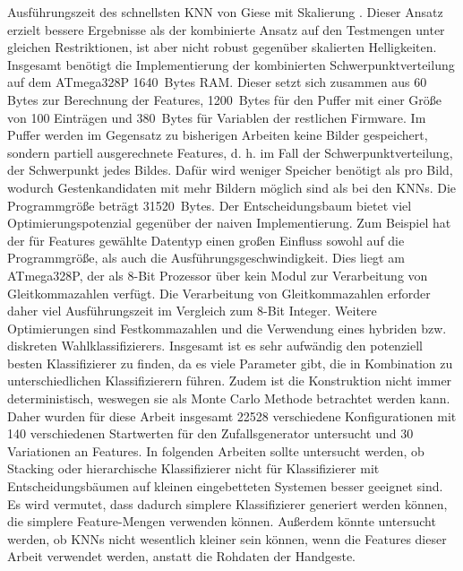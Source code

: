 Ausführungszeit des schnellsten KNN von Giese mit Skalierung \cite{gieseThesis}. Dieser Ansatz erzielt bessere Ergebnisse als der kombinierte Ansatz auf den Testmengen unter gleichen Restriktionen,
ist aber nicht robust gegenüber skalierten Helligkeiten.
\newline
\newline
Insgesamt benötigt die Implementierung der kombinierten Schwerpunktverteilung auf dem ATmega328P 1640~Bytes RAM. Dieser setzt sich zusammen aus 60 Bytes zur Berechnung der Features, 1200~Bytes
für den Puffer mit einer Größe von 100 Einträgen und 380~Bytes für Variablen der restlichen Firmware. Im Puffer werden im Gegensatz zu bisherigen Arbeiten keine Bilder gespeichert, sondern partiell
ausgerechnete Features, d. h. im Fall der Schwerpunktverteilung, der Schwerpunkt jedes Bildes. Dafür wird weniger Speicher benötigt als pro Bild, wodurch Gestenkandidaten mit mehr Bildern möglich sind
als bei den KNNs. Die Programmgröße beträgt 31520~Bytes.
\newline
\newline
Der Entscheidungsbaum bietet viel Optimierungspotenzial gegenüber der naiven Implementierung. Zum Beispiel hat der für Features gewählte Datentyp einen großen Einfluss sowohl auf die Programmgröße, als
auch die Ausführungsgeschwindigkeit. Dies liegt am ATmega328P, der als 8-Bit Prozessor über kein Modul zur Verarbeitung von Gleitkommazahlen verfügt.
Die Verarbeitung von Gleitkommazahlen erforder daher viel Ausführungszeit im Vergleich zum 8-Bit Integer. Weitere Optimierungen sind Festkommazahlen und die Verwendung eines hybriden bzw.
diskreten Wahlklassifizierers.
\newline
\newline
Insgesamt ist es sehr aufwändig den potenziell besten Klassifizierer zu finden, da es viele Parameter gibt, die in Kombination zu unterschiedlichen Klassifizierern führen. Zudem ist die
Konstruktion nicht immer deterministisch, weswegen sie als Monte Carlo Methode betrachtet werden kann. Daher wurden für diese Arbeit insgesamt 22528 verschiedene Konfigurationen mit 140 verschiedenen
Startwerten für den Zufallsgenerator untersucht und 30 Variationen an Features.
\newline
\newline
In folgenden Arbeiten sollte untersucht werden, ob Stacking oder hierarchische Klassifizierer nicht für Klassifizierer mit Entscheidungsbäumen auf kleinen eingebetteten Systemen besser geeignet sind.
Es wird vermutet, dass dadurch simplere Klassifizierer generiert werden können, die simplere Feature-Mengen verwenden können. Außerdem könnte untersucht werden, ob KNNs nicht wesentlich kleiner sein
können, wenn die Features dieser Arbeit verwendet werden, anstatt die Rohdaten der Handgeste.